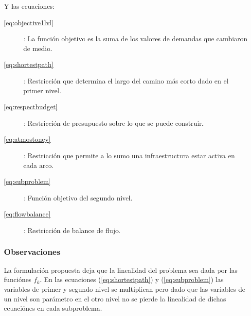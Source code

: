 \documentclass{article}
\begin{document}
  Y las ecuaciones:

  \begin{description}
    \item[\ref{eq:objective1lvl}]: La función objetivo es la suma de los valores de demandas que cambiaron de medio.
    \item[\ref{eq:shortestpath}]: Restricción que determina el largo del camino más corto dado en el primer nivel.
    \item[\ref{eq:respectbudget}]: Restricción de presupuesto sobre lo que se puede construir.
    \item[\ref{eq:atmostoney}]: Restricción que permite a lo sumo una infraestructura estar activa en cada arco.
    \item[\ref{eq:subproblem}]: Función objetivo del segundo nivel.
    \item[\ref{eq:flowbalance}]: Restricción de balance de flujo.
  \end{description}

  \subsubsection*{Observaciones}

  La formulación propuesta deja que la linealidad del problema sea dada por las funciónes $f_k$. En las ecuaciones (\ref{eq:shortestpath}) y (\ref{eq:subproblem}) las variables de primer y segundo nivel se multiplican pero dado que las variables de un nivel son parámetro en el otro nivel no se pierde la linealidad de dichas ecuaciónes en cada subproblema.
\end{document}
